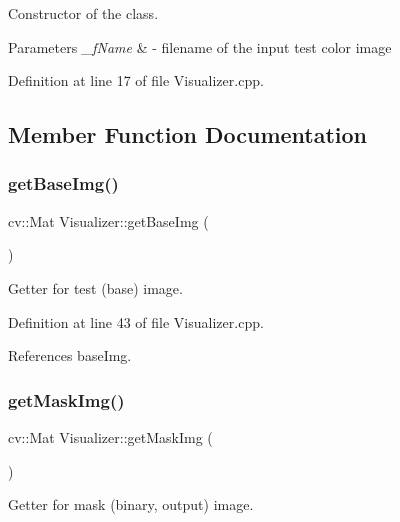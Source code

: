 Constructor of the class. 


\begin{DoxyParams}{Parameters}
{\em \+\_\+f\+Name} & -\/ filename of the input test color image \\
\hline
\end{DoxyParams}


Definition at line 17 of file Visualizer.\+cpp.



\subsection{Member Function Documentation}
\mbox{\label{class_visualizer_a93211a160c72d44453133c91b1495b15}} 
\subsubsection{\texorpdfstring{getBaseImg()}{getBaseImg()}}
{\footnotesize\ttfamily cv\+::\+Mat Visualizer\+::get\+Base\+Img (\begin{DoxyParamCaption}{ }\end{DoxyParamCaption})}



Getter for test (base) image. 



Definition at line 43 of file Visualizer.\+cpp.



References base\+Img.

\mbox{\label{class_visualizer_a0bed72124e97396cbcf6bd76feacfa3e}} 
\subsubsection{\texorpdfstring{getMaskImg()}{getMaskImg()}}
{\footnotesize\ttfamily cv\+::\+Mat Visualizer\+::get\+Mask\+Img (\begin{DoxyParamCaption}{ }\end{DoxyParamCaption})}



Getter for mask (binary, output) image. 



